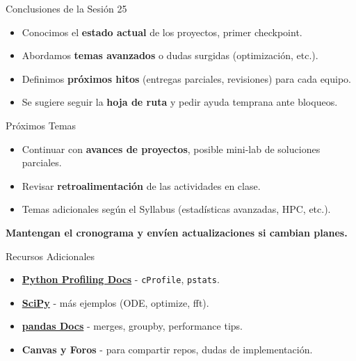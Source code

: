 \documentclass[10pt]{beamer}
\begin{document}
\begin{frame}{Conclusiones de la Sesión 25}
  \begin{itemize}
    \item Conocimos el \textbf{estado actual} de los proyectos, primer checkpoint.
    \item Abordamos \textbf{temas avanzados} o dudas surgidas (optimización, etc.).
    \item Definimos \textbf{próximos hitos} (entregas parciales, revisiones) para cada equipo.
    \item Se sugiere seguir la \textbf{hoja de ruta} y pedir ayuda temprana ante bloqueos.
  \end{itemize}
\end{frame}

\begin{frame}{Próximos Temas}
  \begin{itemize}
    \item Continuar con \textbf{avances de proyectos}, posible mini-lab de soluciones parciales.
    \item Revisar \textbf{retroalimentación} de las actividades en clase.
    \item Temas adicionales según el Syllabus (estadísticas avanzadas, HPC, etc.).
  \end{itemize}
  \vspace{0.3cm}
  \textbf{Mantengan el cronograma y envíen actualizaciones si cambian planes.}
\end{frame}

\begin{frame}{Recursos Adicionales}
  \begin{itemize}
    \item \href{https://docs.python.org/3/library/profile.html}{\textbf{Python Profiling Docs}} - \texttt{cProfile}, \texttt{pstats}.
    \item \href{https://scipy.org/}{\textbf{SciPy}} - más ejemplos (ODE, optimize, fft).
    \item \href{https://pandas.pydata.org/docs/}{\textbf{pandas Docs}} - merges, groupby, performance tips.
    \item \textbf{Canvas y Foros} - para compartir repos, dudas de implementación.
  \end{itemize}
\end{frame}
\end{document}
